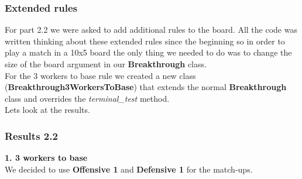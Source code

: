 \documentclass[11pt]{article}
\begin{document}
\subsubsection*{Extended rules}
For part 2.2 we were asked to add additional rules to the board. All the code was written thinking about these extended rules since the beginning so in order to play a match in a 10x5 board the only thing we needed to do was to change the size of the board argument in our \textbf{Breakthrough} class.\\
For the 3 workers to base rule we created a new class (\textbf{Breakthrough3WorkersToBase}) that extends the normal \textbf{Breakthrough} class and overrides the \textit{terminal\_test} method.\\

Lets look at the results.\\

\subsubsection*{Results 2.2}

\textbf{1. 3 workers to base}\\
We decided to use \textbf{Offensive 1} and \textbf{Defensive 1} for the match-ups.\\
\end{document}
